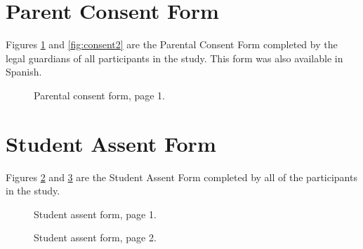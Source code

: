 \section{Parent Consent Form}  \label{sec:parent_consent}
	Figures \ref{fig:consent1} and \ref{fig:consent2} are the Parental Consent Form completed by the legal guardians of all participants in the study. This form was also available in Spanish.
	

	
	\begin{figure}%
   	\centering
   	\caption{Parental consent form, page 1.}
   	\label{fig:consent1}
	\end{figure}

\section{Student Assent Form} \label{sec:student_assent}
	
	Figures \ref{fig:assent1} and \ref{fig:assent2} are the Student Assent Form completed by all of the participants in the study. 

	
	\begin{figure}%
   	\centering
   	\caption{Student assent form, page 1.}
   	\label{fig:assent1}
	\end{figure}
	
	\begin{figure}%
   	\centering
   	\caption{Student assent form, page 2.}
   	\label{fig:assent2}
	\end{figure}

